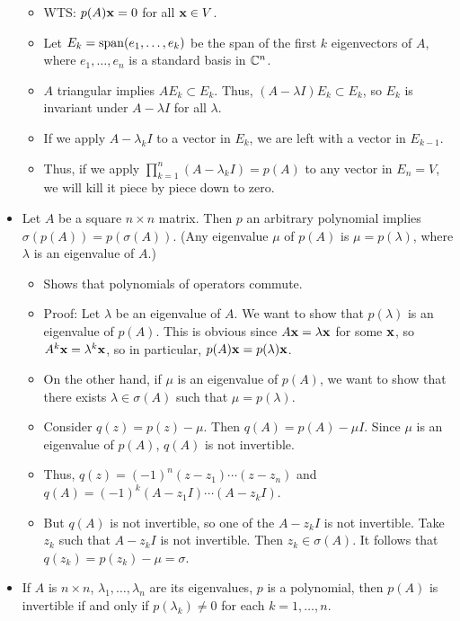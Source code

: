 \documentclass[../../notes.tex]{subfiles}
\begin{document}
\begin{itemize}
\begin{itemize}
        \item WTS: $p(A)\mathbf{x}=0$ for all $\mathbf{x}\in V$.
        \item Let $E_k=\operatorname{span}(e_1,\dots,e_k)$ be the span of the first $k$ eigenvectors of $A$, where $e_1,\dots,e_n$ is a standard basis in $\mathbb{C}^n$.
        \item $A$ triangular implies $AE_k\subset E_k$. Thus, $(A-\lambda I)E_k\subset E_k$, so $E_k$ is invariant under $A-\lambda I$ for all $\lambda$.
        \item If we apply $A-\lambda_kI$ to a vector in $E_k$, we are left with a vector in $E_{k-1}$.
        \item Thus, if we apply $\prod_{k=1}^n(A-\lambda_kI)=p(A)$ to any vector in $E_n=V$, we will kill it piece by piece down to zero.
    \end{itemize}
    \item Let $A$ be a square $n\times n$ matrix. Then $p$ an arbitrary polynomial implies $\sigma(p(A))=p(\sigma(A))$. (Any eigenvalue $\mu$ of $p(A)$ is $\mu=p(\lambda)$, where $\lambda$ is an eigenvalue of $A$.)
    \begin{itemize}
        \item Shows that polynomials of operators commute.
        \item Proof: Let $\lambda$ be an eigenvalue of $A$. We want to show that $p(\lambda)$ is an eigenvalue of $p(A)$. This is obvious since $A\mathbf{x}=\lambda\mathbf{x}$ for some $\mathbf{x}$, so $A^k\mathbf{x}=\lambda^k\mathbf{x}$, so in particular, $p(A)\mathbf{x}=p(\lambda)\mathbf{x}$.
        \item On the other hand, if $\mu$ is an eigenvalue of $p(A)$, we want to show that there exists $\lambda\in\sigma(A)$ such that $\mu=p(\lambda)$.
        \item Consider $q(z)=p(z)-\mu$. Then $q(A)=p(A)-\mu I$. Since $\mu$ is an eigenvalue of $p(A)$, $q(A)$ is not invertible.
        \item Thus, $q(z)=(-1)^n(z-z_1)\cdots(z-z_n)$ and $q(A)=(-1)^k(A-z_1I)\cdots(A-z_kI)$.
        \item But $q(A)$ is not invertible, so one of the $A-z_kI$ is not invertible. Take $z_k$ such that $A-z_kI$ is not invertible. Then $z_k\in\sigma(A)$. It follows that $q(z_k)=p(z_k)-\mu=\sigma$.
    \end{itemize}
    \item If $A$ is $n\times n$, $\lambda_1,\dots,\lambda_n$ are its eigenvalues, $p$ is a polynomial, then $p(A)$ is invertible if and only if $p(\lambda_k)\neq 0$ for each $k=1,\dots,n$.
    \begin{itemize}

\end{itemize}
\end{itemize}
\end{document}
